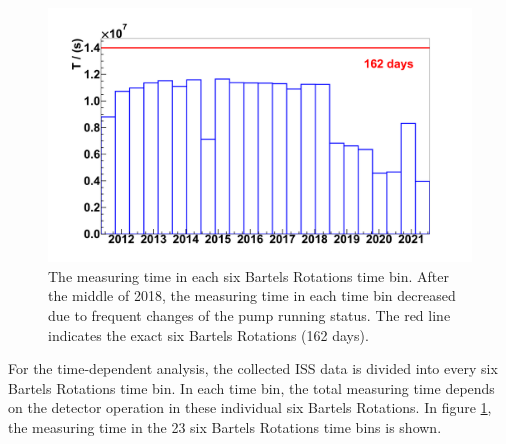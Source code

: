 \begin{figure}[hptb]
\centering
\includegraphics[width=1.0\textwidth, height=0.4\textheight]{Figures/chapter4/MeasuringTime/TimeDependent/TimeDependentMeasuringTime.pdf}
\caption[The measuring time in each six Bartels Rotations time bin.]{The measuring time in each six Bartels Rotations time bin. After the middle of 2018, the measuring time in each time bin decreased due to frequent changes of the pump running status. The red line indicates the exact six Bartels Rotations (162 days).}
\label{TimeDependentMeasuringTime}
\end{figure}    

For the time-dependent analysis, the collected ISS data is divided into every six Bartels Rotations time bin. In each time bin, the total measuring time depends on the detector operation in these individual six Bartels Rotations. In figure \ref{TimeDependentMeasuringTime}, the measuring time in the 23 six Bartels Rotations time bins is shown.












